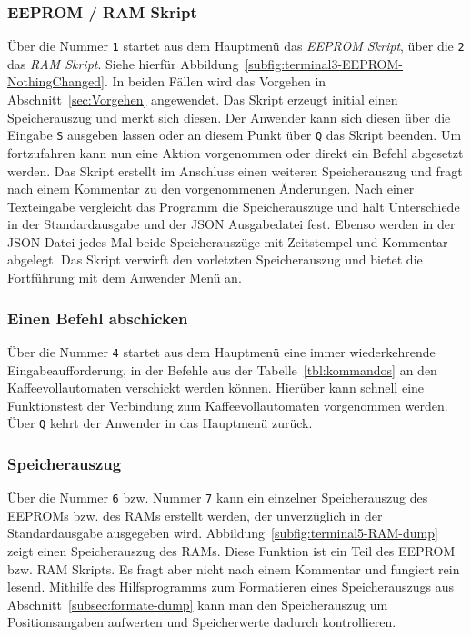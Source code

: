\subsubsection{EEPROM / RAM Skript}\label{subsubsec:EEPROM-RAM-Skript}
Über die Nummer \texttt{1} startet aus dem Hauptmenü das \textit{EEPROM Skript}, über die \texttt{2} das \textit{RAM Skript}.
Siehe hierfür Abbildung~\ref{subfig:terminal3-EEPROM-NothingChanged}.
In beiden Fällen wird das Vorgehen in Abschnitt~\ref{sec:Vorgehen} angewendet.
Das Skript erzeugt initial einen Speicherauszug und merkt sich diesen.
Der Anwender kann sich diesen über die Eingabe \texttt{S} ausgeben lassen oder an diesem Punkt über \texttt{Q} das Skript beenden.
Um fortzufahren kann nun eine Aktion vorgenommen oder direkt ein Befehl abgesetzt werden.
Das Skript erstellt im Anschluss einen weiteren Speicherauszug und fragt nach einem Kommentar zu den vorgenommenen Änderungen.
Nach einer Texteingabe vergleicht das Programm die Speicherauszüge und hält Unterschiede in der Standardausgabe und der \ac{JSON} Ausgabedatei fest.
Ebenso werden in der \ac{JSON} Datei jedes Mal beide Speicherauszüge mit Zeitstempel und Kommentar abgelegt.
Das Skript verwirft den vorletzten Speicherauszug und bietet die Fortführung mit dem Anwender Menü an.

\subsubsection{Einen Befehl abschicken}
Über die Nummer \texttt{4} startet aus dem Hauptmenü eine immer wiederkehrende Eingabeaufforderung, in der Befehle aus der Tabelle~\ref{tbl:kommandos} an den Kaffeevollautomaten verschickt werden können.
Hierüber kann schnell eine Funktionstest der Verbindung zum Kaffeevollautomaten vorgenommen werden.
Über \texttt{Q} kehrt der Anwender in das Hauptmenü zurück.

\subsubsection{Speicherauszug}
Über die Nummer \texttt{6} bzw. Nummer \texttt{7} kann ein einzelner Speicherauszug des \ac{EEPROM}s bzw. des \ac{RAM}s erstellt werden, der unverzüglich in der Standardausgabe ausgegeben wird.
Abbildung~\ref{subfig:terminal5-RAM-dump} zeigt einen Speicherauszug des \ac{RAM}s.
Diese Funktion ist ein Teil des \ac{EEPROM} bzw. \ac{RAM} Skripts.
Es fragt aber nicht nach einem Kommentar und fungiert rein lesend.
Mithilfe des Hilfsprogramms zum Formatieren eines Speicherauszugs aus Abschnitt~\ref{subsec:formate-dump} kann man den Speicherauszug um Positionsangaben aufwerten und Speicherwerte dadurch kontrollieren.

